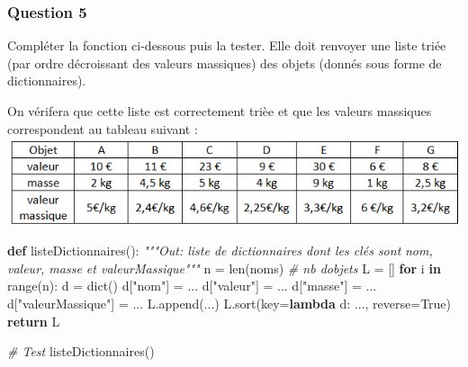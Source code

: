 \documentclass[
  paper=a4,
  ,captions=tableheading
]{scrartcl}
\newenvironment{Shaded}{}{}
\newcommand{\BuiltInTok}[1]{\textcolor[rgb]{0.00,0.50,0.00}{#1}}
\newcommand{\CommentTok}[1]{\textcolor[rgb]{0.38,0.63,0.69}{\textit{#1}}}
\newcommand{\ControlFlowTok}[1]{\textcolor[rgb]{0.00,0.44,0.13}{\textbf{#1}}}
\newcommand{\KeywordTok}[1]{\textcolor[rgb]{0.00,0.44,0.13}{\textbf{#1}}}
\newcommand{\NormalTok}[1]{#1}
\newcommand{\OperatorTok}[1]{\textcolor[rgb]{0.40,0.40,0.40}{#1}}
\newcommand{\StringTok}[1]{\textcolor[rgb]{0.25,0.44,0.63}{#1}}
\newcommand{\VariableTok}[1]{\textcolor[rgb]{0.10,0.09,0.49}{#1}}
\begin{document}
\hypertarget{question-5}{%
\subsubsection{Question 5}\label{question-5}}

Compléter la fonction ci-dessous puis la tester. Elle doit renvoyer une
liste triée (par ordre décroissant des valeurs massiques) des objets
(donnés sous forme de dictionnaires).

On vérifera que cette liste est correctement trièe et que les valeurs
massiques correspondent au tableau suivant :
\includegraphics{images/3-image.png}

\begin{Shaded}
\begin{Highlighting}[]
\KeywordTok{def}\NormalTok{ listeDictionnaires():}
    \CommentTok{"""Out: liste de dictionnaires dont les clés sont}
\CommentTok{    nom, valeur, masse et valeurMassique"""}
\NormalTok{    n }\OperatorTok{=} \BuiltInTok{len}\NormalTok{(noms)  }\CommentTok{\# nb d\textquotesingle{}objets}
\NormalTok{    L }\OperatorTok{=}\NormalTok{ []}
    \ControlFlowTok{for}\NormalTok{ i }\KeywordTok{in} \BuiltInTok{range}\NormalTok{(n):}
\NormalTok{        d }\OperatorTok{=} \BuiltInTok{dict}\NormalTok{()}
\NormalTok{        d[}\StringTok{"nom"}\NormalTok{] }\OperatorTok{=}\NormalTok{ ...}
\NormalTok{        d[}\StringTok{"valeur"}\NormalTok{] }\OperatorTok{=}\NormalTok{ ...}
\NormalTok{        d[}\StringTok{"masse"}\NormalTok{] }\OperatorTok{=}\NormalTok{ ...}
\NormalTok{        d[}\StringTok{"valeurMassique"}\NormalTok{] }\OperatorTok{=}\NormalTok{ ...}
\NormalTok{        L.append(...)}
\NormalTok{    L.sort(key}\OperatorTok{=}\KeywordTok{lambda}\NormalTok{ d: ..., reverse}\OperatorTok{=}\VariableTok{True}\NormalTok{)}
    \ControlFlowTok{return}\NormalTok{ L}
\end{Highlighting}
\end{Shaded}

\begin{Shaded}
\begin{Highlighting}[]
\CommentTok{\# Test}
\NormalTok{listeDictionnaires()}
\end{Highlighting}
\end{Shaded}
\end{document}
